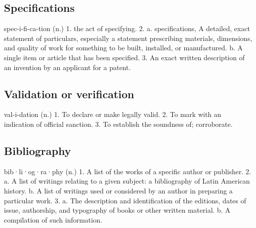 \documentclass[graybox, envcountchap]{Structure/Preamble/svmult}
\begin{document}
\frontmatter%


\tableofcontents


\mainmatter

\begin{partbacktext}
\part{Specifications}
\noindent spec-i-fi-ca-tion (n.) 1. the act of specifying. 2. a. specifications, A detailed, exact statement of particulars, especially a statement prescribing materials, dimensions, and quality of work for something to be built, installed, or manufactured. b. A single item or article that has been specified. 3. An exact written description of an invention by an applicant for a patent.
\end{partbacktext}









\begin{partbacktext}
\part{Validation or verification}
\noindent val-i-dation (n.) 1. To declare or make legally valid. 2. To mark with an indication of official sanction. 3. To establish the soundness of; corroborate.
\end{partbacktext}







\begin{partbacktext}
\part{Bibliography}
\noindent bib·li·og·ra·phy (n.) 1. A list of the works of a specific author or publisher. 2. a. A list of writings relating to a given subject: a bibliography of Latin American history. b. A list of writings used or considered by an author in preparing a particular work. 3. a. The description and identification of the editions, dates of issue, authorship, and typography of books or other written material. b. A compilation of such information.
\end{partbacktext}

 

\backmatter%
%

\printindex

\end{document}
